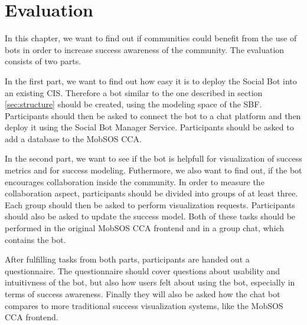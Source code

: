 \chapter{Evaluation}
In this chapter, we want to find out if communities could benefit from the use of bots in order to increase success awareness of the community.
The evaluation consists of two parts.

In the first part, we want to find out how easy it is to deploy the Social Bot into an existing CIS. Therefore a bot similar to the one described in section \ref{sec:structure} should be created, using the modeling space of the SBF. Participants should then be asked to connect the bot to a chat platform and then deploy it using the Social Bot Manager Service. Participants should be asked to add a database to the MobSOS CCA.

In the second part, we want to see if the bot is helpfull for visualization of success metrics and for success modeling. Futhermore, we also want to find out, if the bot encourages collaboration inside the community. In order to measure the collaboration aspect, participants should be divided into groups of at least three. Each group should then be asked to perform visualization requests. Participants should also be asked to update the success model. Both of these tasks should be performed in the original MobSOS CCA frontend and in a group chat, which contains the bot.

After fulfilling tasks from both parts, participants are handed out a questionnaire. The questionnaire should cover questions about usability and intuitivness of the bot, but also how users felt about using the bot, especially in terms of success awareness.
Finally they will also be asked how the chat bot compares to more traditional success visualization systems, like the MobSOS CCA frontend.


